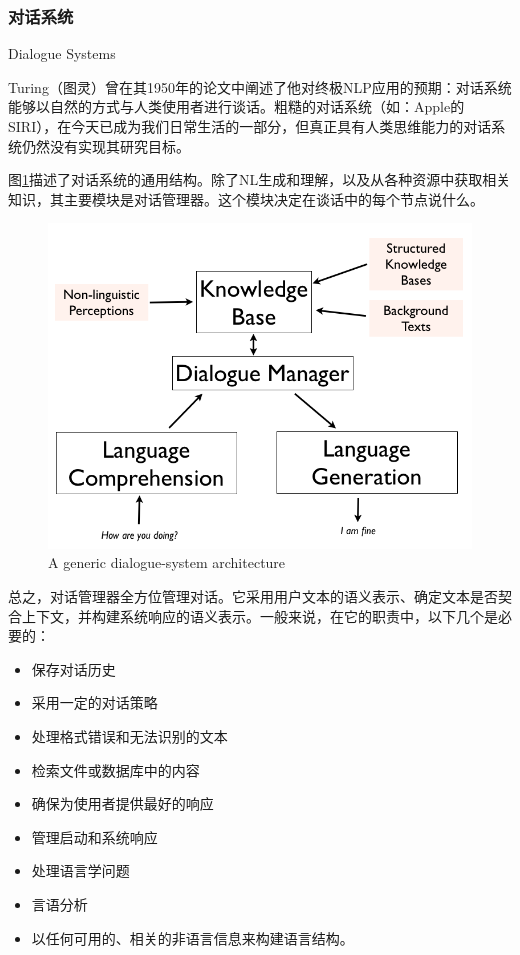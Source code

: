 \subsubsection{对话系统}{Dialogue Systems}

Turing（图灵）曾在其1950年的论文中阐述了他对终极NLP应用的预期：对话系统能够以自然的方式与人类使用者进行谈话。粗糙的对话系统（如：Apple的SIRI），在今天已成为我们日常生活的一部分，但真正具有人类思维能力的对话系统仍然没有实现其研究目标。

图\ref{fig:dialogue}描述了对话系统的通用结构\cite{Arora2013}。除了NL生成和理解，以及从各种资源中获取相关知识，其主要模块是对话管理器。这个模块决定在谈话中的每个节点说什么。

\begin{figure}[htb]
\centering
\includegraphics[width=12cm]{figures/dialogue_system.png}
\caption{ A generic dialogue-system architecture }
\label{fig:dialogue}
\end{figure}

总之，对话管理器全方位管理对话。它采用用户文本的语义表示、确定文本是否契合上下文，并构建系统响应的语义表示。一般来说，在它的职责中，以下几个是必要的：

\begin{itemize}
\item 保存对话历史
\item 采用一定的对话策略
\item 处理格式错误和无法识别的文本
\item 检索文件或数据库中的内容
\item 确保为使用者提供最好的响应
\item 管理启动和系统响应
\item 处理语言学问题
\item 言语分析
\item 以任何可用的、相关的非语言信息来构建语言结构。
\end{itemize}

